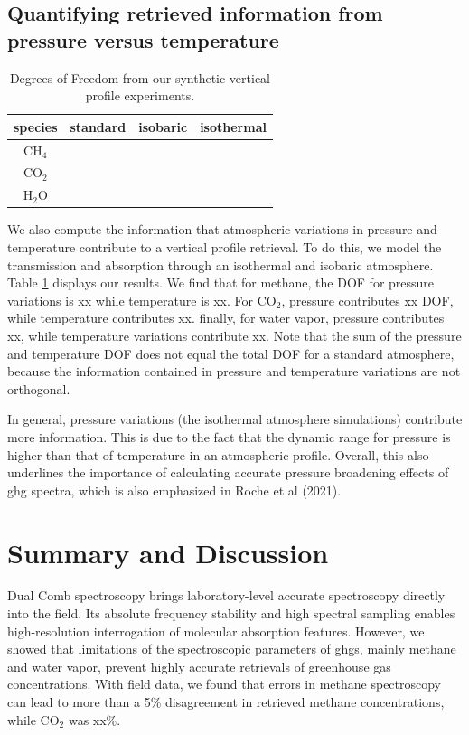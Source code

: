 \documentclass[amt, manuscript]{copernicus}
\begin{document}
\subsection{Quantifying retrieved information from pressure versus temperature }
\begin{table}
  \centering
  \begin{tabular}{| c | c | c | c |}
    species & standard & isobaric & isothermal \\
    \hline
    CH$_4$ & & & \\
    CO$_2$ & & & \\
    H$_2$O & & & \\
    \hline
  \end{tabular}
  \caption{Degrees of Freedom from our synthetic vertical profile experiments.}
  \label{tab:3}
\end{table}
We also compute the information that atmospheric variations in pressure and temperature contribute to a vertical profile retrieval. To do this, we model the transmission and absorption through an isothermal and isobaric atmosphere. Table \ref{tab:3} displays our results. We find that for methane, the DOF for pressure variations is xx while temperature is xx. For CO$_2$, pressure contributes xx DOF, while temperature contributes xx. finally, for water vapor, pressure contributes xx, while temperature variations contribute xx. Note that the sum of the pressure and temperature DOF does not equal the total DOF for a standard atmosphere, because the information contained in pressure and temperature variations are not orthogonal. 

In general, pressure variations (the isothermal atmosphere simulations) contribute more information. This is due to the fact that the dynamic range for pressure is higher than that of temperature in an atmospheric profile. Overall, this also underlines the importance of calculating accurate pressure broadening effects of ghg spectra, which is also emphasized in Roche et al (2021).



\section{Summary and Discussion}
Dual Comb spectroscopy brings laboratory-level accurate spectroscopy directly into the field. Its absolute frequency stability and high spectral sampling enables high-resolution interrogation of molecular absorption features. However, we showed that limitations of the spectroscopic parameters of ghgs, mainly methane and water vapor, prevent highly accurate retrievals of greenhouse gas concentrations. With field data, we found that errors in methane spectroscopy can lead to more than a 5\% disagreement in retrieved methane concentrations, while CO$_2$ was xx\%.
\end{document}
